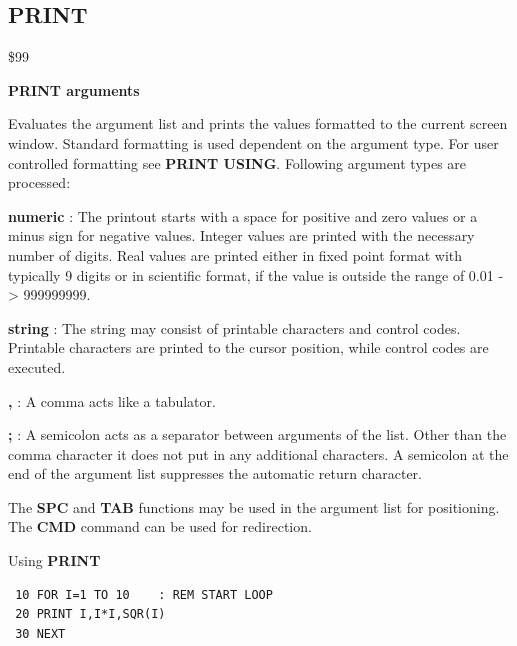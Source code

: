\subsection{PRINT}
\begin{description}[leftmargin=2cm,style=nextline]
\item [Token:] \$99
\item [Format:] {\bf PRINT arguments}
\item [Usage:]  Evaluates the argument list and prints the values
                formatted to the current screen window.
                Standard formatting is used dependent on the
                argument type. For user controlled formatting
                see {\bf PRINT USING}.
                Following argument types are processed:

                {\bf numeric} : The printout starts with a space
                for positive and zero values or a minus sign for
                negative values. Integer values are printed with
                the necessary number of digits. Real values are
                printed either in fixed point format with typically
                9 digits or in scientific format, if the value is
                outside the range of 0.01 -> 999999999.

                {\bf string} : The string may consist of printable
                characters and control codes. Printable characters
                are printed to the cursor position, while control
                codes are executed.

                {\bf ,} : A comma acts like a tabulator.

                {\bf ;} : A semicolon acts as a separator between
                arguments of the list. Other than the comma character
                it does not put in any additional characters.
                A semicolon at the end of the argument list suppresses
                the automatic return character.

\item [Remarks:] The {\bf SPC} and {\bf TAB} functions
                 may be used in the argument list
                 for positioning.
                 The {\bf CMD} command can be used for redirection.

\item [Example:] Using {\bf PRINT}

\begin{tcolorbox}[colback=black,coltext=white]
\verbatimfont{\codefont}
\begin{verbatim}
 10 FOR I=1 TO 10    : REM START LOOP
 20 PRINT I,I*I,SQR(I)
 30 NEXT
\end{verbatim}
\end{tcolorbox}
\end{description}

